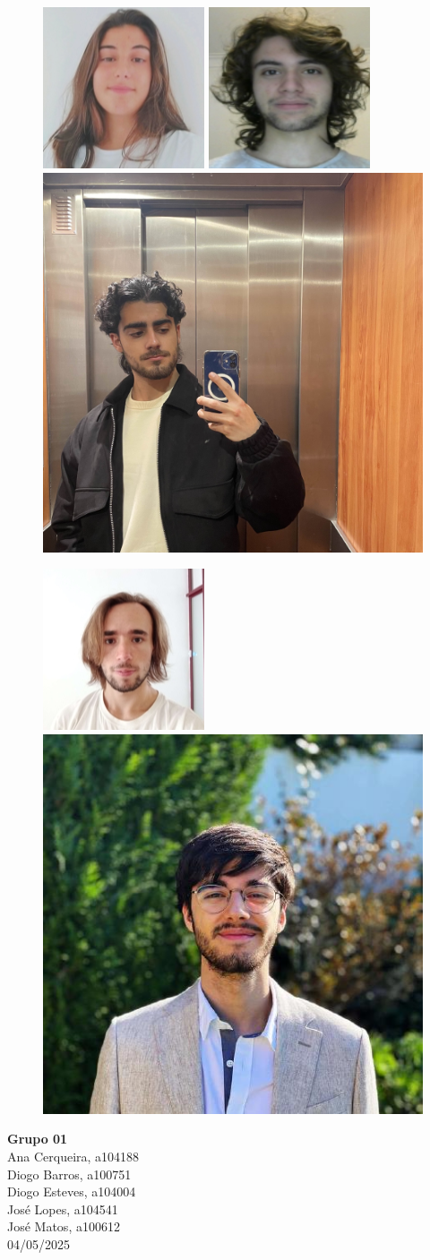 \documentclass{article}
\begin{document}
\begin{titlepage}
    \begin{figure}[H]
        \centering
        \includegraphics[width=0.25\linewidth]{carolina.png}
        \includegraphics[width=0.25\linewidth]{diogo.png}
        \includegraphics[width=0.25\linewidth]{esteves.jpg}
        \label{fig:enter-label}
    \end{figure}
    \begin{figure}[H]
        \centering
        \includegraphics[width=0.25\linewidth]{ze.png}
        \includegraphics[width=0.25\linewidth]{rodrigo.jpg}
        \label{fig:enter-label}
    \end{figure}

    \vfill
    \begin{flushright}
        \textbf{Grupo 01} \\
        Ana Cerqueira, a104188 \\
        Diogo Barros, a100751 \\
        Diogo Esteves, a104004 \\
        José Lopes, a104541 \\
        José Matos, a100612 \\
        \vspace{0.5cm}
        04/05/2025
    \end{flushright}
\end{titlepage}
\end{document}
